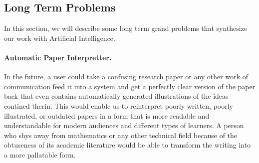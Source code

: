 \documentclass[12pt, letterpaper]{article}
\begin{document}
	\subsection{Long Term Problems}

		In this section, we will describe some long term grand problems that synthesize our work with Artificial Intelligence.

		\paragraph{Automatic Paper Interpretter.}
		In the future, a user could take a confusing research paper or any other work of communication feed it into a system and get a perfectly clear version of the paper back
		that even contains automatically generated illustrations of the ideas contined therin. This would enable us to reinterpret poorly written,
		poorly illustrated, or outdated papers in a form that is more readable and understandable for modern audiences and different types of learners.
		A person who shys away from mathematics or any other technical field because of the obtuseness of its academic literature would be able to 
		transform the writing into a more pallatable form.

\newpage
\end{document}

